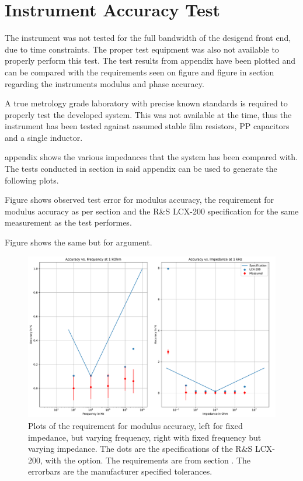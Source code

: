 \section{Instrument Accuracy Test} \label{subsec:8_1_AccTest}
The instrument was not tested for the full bandwidth of the desigend front end, due to time constraints. The proper test equipment was also not available to properly perform this test. The test results from appendix  have been plotted and can be compared with the requirements seen on figure  and figure  in section  regarding the instruments modulus and phase accuracy.

A true metrology grade laboratory with precise known standards is required to properly test the developed system. This was not available at the time, thus the instrument has been tested against assumed stable film resistors, PP capacitors and a single inductor.

appendix  shows the various impedances that the system has been compared with. The tests conducted in section  in said appendix can be used to generate the following plots. 

Figure  shows observed test error for modulus accuracy, the requirement for modulus accuracy as per section  and the R\&S LCX-200 specification for the same measurement as the test performes.

Figure  shows the same but for argument.


\begin{figure}[H]
    \centering
    \includegraphics[width=1\textwidth]{Sections/8_SystemVerification/Figures/SpecVTest.pdf}
    \caption{Plots of the requirement for modulus accuracy, left for fixed impedance, but varying frequency, right with fixed frequency but varying impedance. The dots are the specifications of the R\&S LCX-200, with the  option. The requirements are from section . The errorbars are the manufacturer specified tolerances.}
    \label{fig_8_ModulusAccuracy}
\end{figure}
  

